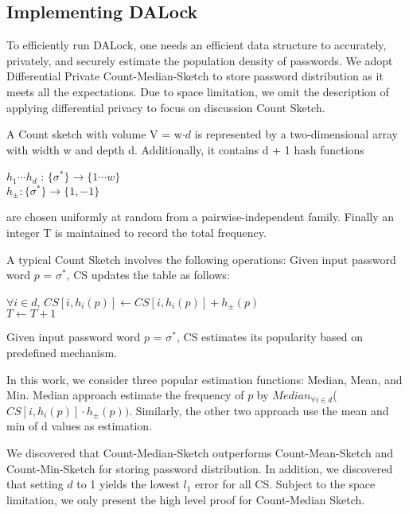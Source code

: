 \subsection{Implementing DALock}

To efficiently run DALock, one needs an efficient data structure to accurately, privately, and securely estimate the population density of passwords. We adopt Differential Private Count-Median-Sketch to store password distribution as it meets all the expectations. Due to space limitation, we omit the description of applying differential privacy to focus on discussion Count Sketch.

\begin{definition}A Count sketch with volume V = w$\cdot d$ is represented by a two-dimensional array with width w and depth d. Additionally, it contains d + 1 hash functions
\begin{center}
$h_1 \cdots h_d$ : $\{\sigma^*\} \rightarrow \{1\cdots w\}$\\
$h_{\pm} : \{\sigma^*\} \rightarrow \{1, -1\}$\\
\end{center}
are chosen uniformly at random from a pairwise-independent family. Finally an integer T is maintained to record the total frequency.
\end{definition}
A typical Count Sketch involves the following operations:
 Given input password word $p$ = $\sigma^*$, CS updates the table as follows: 
\begin{center}$\forall i \in d$, $CS[i,h_i(p)] \leftarrow CS[i,h_i(p)] + h_{\pm}(p)  $ \\ $T \leftarrow T + 1$  
\end{center}
 Given input password word $p$ = $\sigma^*$, CS estimates its popularity based on predefined mechanism. 

In this work, we consider three popular estimation functions: Median, Mean, and Min. Median approach estimate the frequency of $p$ by $Median_{\forall i \in d}$( $CS[i,h_i(p)]\cdot h_{\pm}(p))$. Similarly, the other two approach use the mean and min of d values as estimation. 

 We discovered that Count-Median-Sketch outperforms Count-Mean-Sketch and Count-Min-Sketch for storing password distribution. In addition, we discovered that setting $d$ to 1 yields the lowest $l_1$ error for all CS. Subject to the space limitation, we only present the high level proof for Count-Median Sketch. 

